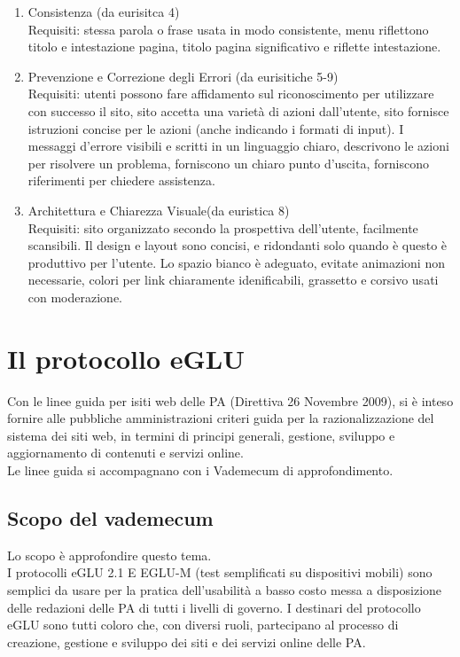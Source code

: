 \documentclass{article}
\begin{document}
\begin{enumerate}
	\item Consistenza (da eurisitca 4)\\
	Requisiti: stessa parola o frase usata in modo consistente, menu riflettono titolo e intestazione pagina, titolo pagina significativo e riflette intestazione.
	\item Prevenzione e Correzione degli Errori (da eurisitiche 5-9)\\
	Requisiti: utenti possono fare affidamento sul riconoscimento per utilizzare con successo il sito, sito accetta una varietà di azioni dall'utente, sito fornisce istruzioni concise per le azioni (anche indicando i formati di input). I messaggi d'errore visibili e scritti in un linguaggio chiaro, descrivono le azioni per risolvere un problema, forniscono un chiaro punto d'uscita, forniscono riferimenti per chiedere assistenza.
	\item Architettura e Chiarezza Visuale(da euristica 8)\\
	Requisiti: sito organizzato secondo la prospettiva dell'utente, facilmente scansibili. Il design e layout sono concisi, e ridondanti solo quando è questo è produttivo per l'utente. Lo spazio bianco è adeguato, evitate animazioni non necessarie, colori per link chiaramente idenificabili, grassetto e corsivo usati con moderazione.
\end{enumerate}
\section{Il protocollo eGLU}
Con le linee guida per isiti web delle PA (Direttiva 26 Novembre 2009), si è inteso fornire alle pubbliche amministrazioni criteri guida per la razionalizzazione del sistema dei siti web, in termini di principi generali, gestione, sviluppo e aggiornamento di contenuti e servizi online.\\
Le linee guida si accompagnano con i Vademecum di approfondimento.
\subsection{Scopo del vademecum}
Lo scopo è approfondire questo tema.\\
I protocolli eGLU 2.1 E EGLU-M (test semplificati su dispositivi mobili) sono semplici da usare per la pratica dell'usabilità a basso costo messa a disposizione delle redazioni delle PA di tutti i livelli di governo. I destinari del protocollo eGLU sono tutti coloro che, con diversi ruoli, partecipano al processo di creazione, gestione e sviluppo dei siti e dei servizi online delle PA.
\end{document}
